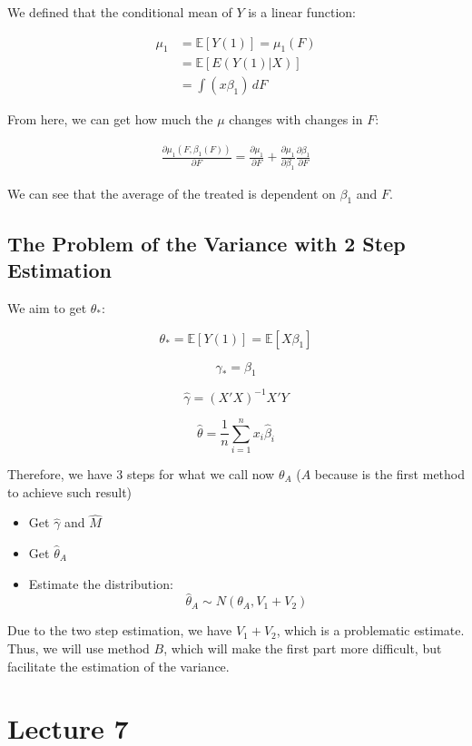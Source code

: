 \documentclass{article}
\begin{document}
We defined that the conditional mean of $Y$ is a linear function:

\begin{align*}
    \mu_1 &= \mathbb{E}[Y(1)] = \mu_1(F) \\
    &= \mathbb{E}[E(Y(1)| X)] \\
    &= \int (x \beta_1) \, dF
\end{align*}

From here, we can get how much the $\mu$ changes with changes in $F$:

\begin{align*}
    \frac{\partial \mu_1 (F, \beta_1 (F))}{\partial F}
    = \frac{\partial \mu_1}{\partial F} +
    \frac{\partial \mu_1}{\partial \beta_1}
    \frac{\partial \beta_1}{\partial F}
\end{align*}

We can see that the average of the treated is dependent on $\beta_1$ and $F$.

\subsection{The Problem of the Variance with 2 Step Estimation}

We aim to get $\theta_{*}$:

$$
\theta_* = \mathbb{E}[Y(1)] = \mathbb{E}[X \beta_1]
$$

$$
\gamma_* = \beta_1
$$

$$
\hat{\gamma} = (X'X)^{-1} X'Y
$$

$$
\hat{\theta} = \frac{1}{n} \sum_{i=1}^{n} x_i \hat{\beta}_i
$$

Therefore, we have 3 steps for what we call now $\theta_A$ ($A$ because is the first method to achieve such result)

\begin{itemize}
    \item Get $\hat{\gamma}$ and $\hat{M}$
    \item Get $\hat{\theta}_A$
    \item Estimate the distribution:
    $$
    \hat{\theta}_A \sim {N} (\theta_A, V_1 + V_2)
    $$
\end{itemize}

Due to the two step estimation, we have $V_1 + V_2$, which is a problematic estimate. Thus, we will use method $B$, which will make the first part more difficult, but facilitate the estimation of the variance.

\section{Lecture 7}
\end{document}
